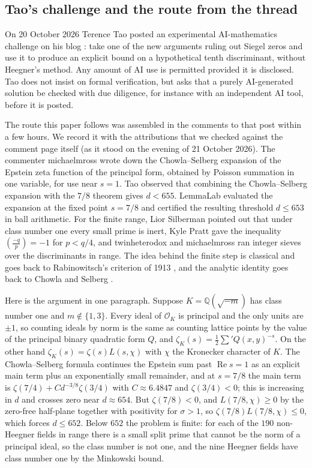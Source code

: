 \documentclass[11pt]{article}
\theoremstyle{definition}
\newcommand{\re}{\operatorname{Re}}
\newcommand{\Q}{\mathbb{Q}}
\newcommand{\OK}{\mathcal{O}_K}
\begin{document}
\subsection{Tao's challenge and the route from the thread}

On 20 October 2026 Terence Tao posted an experimental AI-mathematics challenge on his blog \cite{Tao2026}: take one of the new arguments ruling out Siegel zeros and use it to produce an explicit bound on a hypothetical tenth discriminant, without Heegner's method. Any amount of AI use is permitted provided it is disclosed. Tao does not insist on formal verification, but asks that a purely AI-generated solution be checked with due diligence, for instance with an independent AI tool, before it is posted.

The route this paper follows was assembled in the comments to that post within a few hours. We record it with the attributions that we checked against the comment page itself (as it stood on the evening of 21 October 2026). The commenter michaelmross wrote down the Chowla--Selberg expansion of the Epstein zeta function of the principal form, obtained by Poisson summation in one variable, for use near $s = 1$. Tao observed that combining the Chowla--Selberg expansion with the $7/8$ theorem gives $d < 655$. LemmaLab evaluated the expansion at the fixed point $s = 7/8$ and certified the resulting threshold $d \le 653$ in ball arithmetic. For the finite range, Lior Silberman pointed out that under class number one every small prime is inert, Kyle Pratt gave the inequality $\left(\frac{-q}{p}\right) = -1$ for $p < q/4$, and twinheterodox and michaelmross ran integer sieves over the discriminants in range. The idea behind the finite step is classical and goes back to Rabinowitsch's criterion of 1913 \cite{Rabinowitsch1913}, and the analytic identity goes back to Chowla and Selberg \cite{ChowlaSelberg1967}.

Here is the argument in one paragraph. Suppose $K = \Q(\sqrt{-m})$ has class number one and $m \notin \{1, 3\}$. Every ideal of $\OK$ is principal and the only units are $\pm 1$, so counting ideals by norm is the same as counting lattice points by the value of the principal binary quadratic form $Q$, and $\zeta_K(s) = \frac12 \sum' Q(x,y)^{-s}$. On the other hand $\zeta_K(s) = \zeta(s) L(s,\chi)$ with $\chi$ the Kronecker character of $K$. The Chowla--Selberg formula continues the Epstein sum past $\re s = 1$ as an explicit main term plus an exponentially small remainder, and at $s = 7/8$ the main term is $\zeta(7/4) + C d^{-3/8}\zeta(3/4)$ with $C \approx 6.4847$ and $\zeta(3/4) < 0$; this is increasing in $d$ and crosses zero near $d \approx 654$. But $\zeta(7/8) < 0$, and $L(7/8,\chi) \ge 0$ by the zero-free half-plane together with positivity for $\sigma > 1$, so $\zeta(7/8)L(7/8,\chi) \le 0$, which forces $d \le 652$. Below $652$ the problem is finite: for each of the $190$ non-Heegner fields in range there is a small split prime that cannot be the norm of a principal ideal, so the class number is not one, and the nine Heegner fields have class number one by the Minkowski bound.
\end{document}
